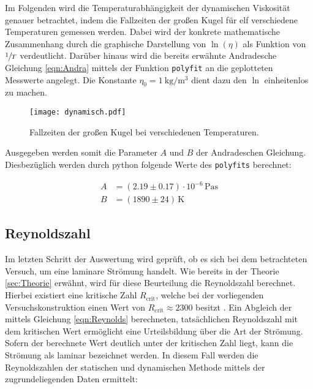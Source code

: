 Im Folgenden wird die Temperaturabhängigkeit der dynamischen Viskosität genauer betrachtet, indem die Fallzeiten 
der großen Kugel für elf verschiedene Temperaturen gemessen werden. Dabei wird der konkrete mathematische Zusammenhang 
durch die graphische Darstellung von $\ln(\eta)$ als Funktion von $\sfrac{1}{T}$ verdeutlicht. Darüber hinaus wird die 
bereits erwähnte Andradesche Gleichung \eqref{eqn:Andra} mittels der Funktion \texttt{polyfit} an die geplotteten Messwerte 
angelegt. Die Konstante $\eta_0 = \qty{1}{\kilo \gram \per \cubic \meter}$ dient dazu den $\ln{}$ einheitenlos zu machen.

\begin{figure}[H]
    \centering
    \texttt{[image: dynamisch.pdf]}
    \caption{Fallzeiten der großen Kugel bei verschiedenen Temperaturen.}
\end{figure}

\noindent Ausgegeben werden somit die Parameter $A$ und $B$ der Andradeschen Gleichung. Diesbezüglich werden durch 
python folgende Werte des \texttt{polyfits} berechnet:

\begin{align*}
    A &= \left(2.19 \pm 0.17\right) \cdot 10^{-6}\,\unit{\pascal\second}\\
    B &= \left(1890 \pm 24\right)\,\unit{\kelvin}
\end{align*}

\subsection{Reynoldszahl}

Im letzten Schritt der Auswertung wird geprüft, ob es sich bei dem betrachteten Versuch, um eine laminare Strömung handelt.
Wie bereits in der Theorie \ref{sec:Theorie} erwähnt, wird für diese Beurteilung die Reynoldszahl berechnet. Hierbei existiert
eine kritische Zahl $R_\text{crit}$, welche bei der vorliegenden Versuchskonstruktion einen Wert von $R_\text{crit} \approx 2300$
besitzt \cite{Physikalisches_Praktikum}. Ein Abgleich der mittels Gleichung \eqref{eqn:Reynolds} berechneten, tatsächlichen Reynoldszahl mit dem kritischen
Wert ermöglicht eine Urteilsbildung über die Art der Strömung. Sofern der berechnete Wert deutlich unter der kritischen Zahl liegt,
kann die Strömung als laminar bezeichnet werden. In diesem Fall werden die Reynoldszahlen der statischen und dynamischen 
Methode mittels der zugrundeliegenden Daten ermittelt:

